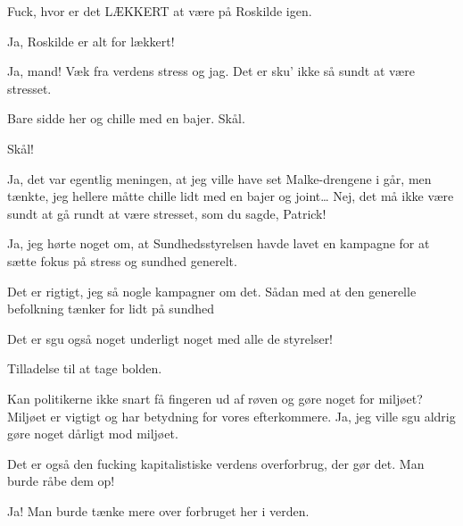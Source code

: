 \documentclass[a4paper,11pt]{article}
\begin{document}
\begin{sketch}



 Fuck, hvor er det LÆKKERT at være på Roskilde igen.

 Ja, Roskilde er alt for lækkert!

 Ja, mand! Væk fra verdens stress og jag. Det er sku’ ikke så sundt at være stresset.

 Bare sidde her og chille med en bajer. Skål.

 Skål!

 Ja, det var egentlig meningen, at jeg ville have set Malke-drengene i går, men tænkte, jeg hellere måtte chille lidt med en bajer og joint…   Nej, det må ikke være sundt at gå rundt at være stresset, som du sagde, Patrick!

 Ja, jeg hørte noget om, at Sundhedsstyrelsen havde lavet en kampagne for at sætte fokus på stress  og sundhed generelt.

  Det er rigtigt, jeg så nogle kampagner om det. Sådan med at den generelle befolkning tænker for lidt på sundhed 

 Det er sgu også noget underligt noget med alle de styrelser! 

 Tilladelse til at tage bolden. 

 Kan politikerne ikke snart få fingeren ud af røven og gøre noget for miljøet? Miljøet er vigtigt og har betydning for vores efterkommere. Ja, jeg ville sgu aldrig gøre noget dårligt mod miljøet. 

 Det er også den fucking kapitalistiske verdens overforbrug, der gør det. Man burde råbe dem op!


 Ja! Man burde tænke mere over forbruget her i verden.


\end{sketch}
\end{document}
